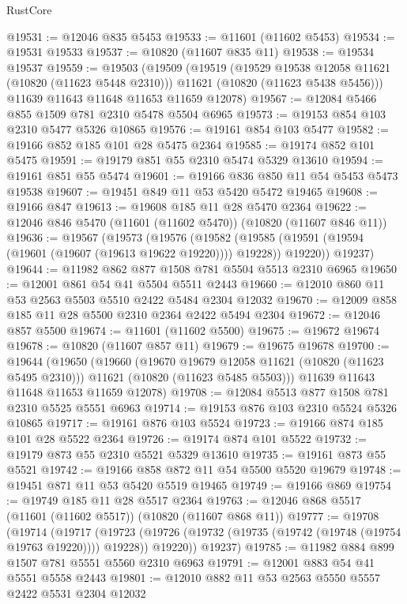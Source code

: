 \begin{lexlean}{RustCore}
\begin{coremodule}
@19531 := @12046 @835 @5453
@19533 := @11601 (@11602 @5453)
@19534 := @19531 @19533
@19537 := @10820 (@11607 @835 @11)
@19538 := @19534 @19537
@19559 := @19503
    (@19509
      (@19519
        (@19529 @19538 @12058 @11621 (@10820 (@11623 @5448 @2310)))
        @11621
        (@10820 (@11623 @5438 @5456)))
      @11639
      @11643
      @11648
      @11653
      @11659
      @12078)
@19567 := @12084 @5466 @855 @1509 @781 @2310 @5478 @5504 @6965
@19573 := @19153 @854 @103 @2310 @5477 @5326 @10865
@19576 := @19161 @854 @103 @5477
@19582 := @19166 @852 @185 @101 @28 @5475 @2364
@19585 := @19174 @852 @101 @5475
@19591 := @19179 @851 @55 @2310 @5474 @5329 @13610
@19594 := @19161 @851 @55 @5474
@19601 := @19166 @836 @850 @11 @54 @5453 @5473 @19538
@19607 := @19451 @849 @11 @53 @5420 @5472 @19465
@19608 := @19166 @847
@19613 := @19608 @185 @11 @28 @5470 @2364
@19622 := @12046 @846 @5470 (@11601 (@11602 @5470)) (@10820 (@11607 @846 @11))
@19636 := @19567
    (@19573
      (@19576
        (@19582 (@19585 (@19591 (@19594 (@19601 (@19607 (@19613 @19622 @19220)))) @19228)) @19220))
      @19237)
@19644 := @11982 @862 @877 @1508 @781 @5504 @5513 @2310 @6965
@19650 := @12001 @861 @54 @41 @5504 @5511 @2443
@19660 := @12010 @860 @11 @53 @2563 @5503 @5510 @2422 @5484 @2304 @12032
@19670 := @12009 @858 @185 @11 @28 @5500 @2310 @2364 @2422 @5494 @2304
@19672 := @12046 @857 @5500
@19674 := @11601 (@11602 @5500)
@19675 := @19672 @19674
@19678 := @10820 (@11607 @857 @11)
@19679 := @19675 @19678
@19700 := @19644
    (@19650
      (@19660
        (@19670 @19679 @12058 @11621 (@10820 (@11623 @5495 @2310)))
        @11621
        (@10820 (@11623 @5485 @5503)))
      @11639
      @11643
      @11648
      @11653
      @11659
      @12078)
@19708 := @12084 @5513 @877 @1508 @781 @2310 @5525 @5551 @6963
@19714 := @19153 @876 @103 @2310 @5524 @5326 @10865
@19717 := @19161 @876 @103 @5524
@19723 := @19166 @874 @185 @101 @28 @5522 @2364
@19726 := @19174 @874 @101 @5522
@19732 := @19179 @873 @55 @2310 @5521 @5329 @13610
@19735 := @19161 @873 @55 @5521
@19742 := @19166 @858 @872 @11 @54 @5500 @5520 @19679
@19748 := @19451 @871 @11 @53 @5420 @5519 @19465
@19749 := @19166 @869
@19754 := @19749 @185 @11 @28 @5517 @2364
@19763 := @12046 @868 @5517 (@11601 (@11602 @5517)) (@10820 (@11607 @868 @11))
@19777 := @19708
    (@19714
      (@19717
        (@19723 (@19726 (@19732 (@19735 (@19742 (@19748 (@19754 @19763 @19220)))) @19228)) @19220))
      @19237)
@19785 := @11982 @884 @899 @1507 @781 @5551 @5560 @2310 @6963
@19791 := @12001 @883 @54 @41 @5551 @5558 @2443
@19801 := @12010 @882 @11 @53 @2563 @5550 @5557 @2422 @5531 @2304 @12032

\end{coremodule}
\end{lexlean}

